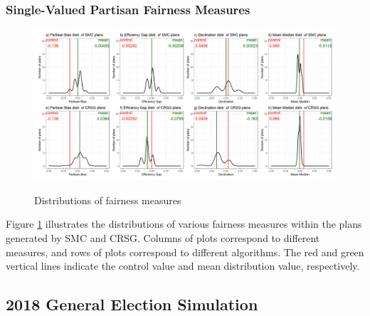 \subsubsection{Single-Valued Partisan Fairness Measures}
\begin{landscape}
    \begin{figure}
        \centering
        \caption{Distributions of fairness measures}
        \includegraphics{img/fair.density.png}
        \label{fig:fair.density}
        \raggedright
    \end{figure}
\end{landscape}

Figure \ref{fig:fair.density} illustrates the distributions of various fairness measures within the plans generated by SMC and CRSG. Columns of plots correspond to different measures, and rows of plots correspond to different algorithms. The red and green vertical lines indicate the control value and mean distribution value, respectively. 

\subsection{2018 General Election Simulation}

